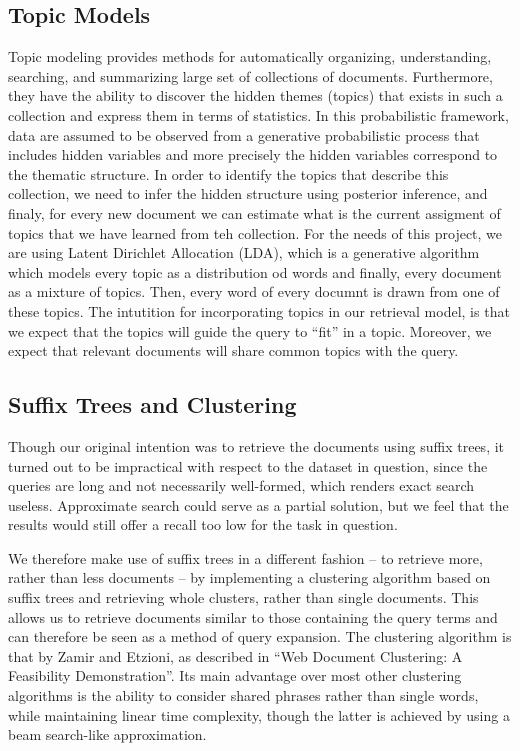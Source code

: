 \documentclass[11pt, a4paper, abstraction]{scrartcl}
\begin{document}
\subsection{Topic Models}
Topic modeling provides methods for automatically organizing, understanding, searching, and summarizing large set of collections of documents. Furthermore, they have the ability to discover the hidden themes (topics) that exists in such a collection and express them in terms of statistics. In this probabilistic framework, data are assumed to be observed from a generative probabilistic process that includes hidden variables and more precisely the hidden variables correspond to the thematic structure. In order to identify the topics that describe this collection, we need to infer the hidden structure using posterior inference, and finaly, for every new document we can estimate what is the current assigment of topics that we have learned from teh collection. 
For the needs of this project, we are using Latent Dirichlet Allocation (LDA), which is a generative algorithm which models every topic as a distribution od words and finally, every document as a mixture of topics. Then, every word of every documnt is drawn from one of these topics. 
The intutition for incorporating topics in our retrieval model, is that we expect that the topics will guide the query to ``fit'' in a topic. Moreover, we expect that relevant documents will share common topics with the query.


\subsection{Suffix Trees and Clustering}
Though our original intention was to retrieve the documents using suffix trees, it turned out to be impractical with respect to the dataset in question, since the queries are long and not necessarily well-formed, which renders exact search useless. Approximate search could serve as a partial solution, but we feel that the results would still offer a recall too low for the task in question.

We therefore make use of suffix trees in a different fashion -- to retrieve more, rather than less documents -- by implementing a clustering algorithm based on suffix trees and retrieving whole clusters, rather than single documents. This allows us to retrieve documents similar to those containing the query terms and can therefore be seen as a method of query expansion. The clustering algorithm is that by Zamir and Etzioni, as described in ``Web Document Clustering: A Feasibility Demonstration''. Its main advantage over most other clustering algorithms is the ability to consider shared phrases rather than single words, while maintaining linear time complexity, though the latter is achieved by using a beam search-like approximation.
\end{document}
